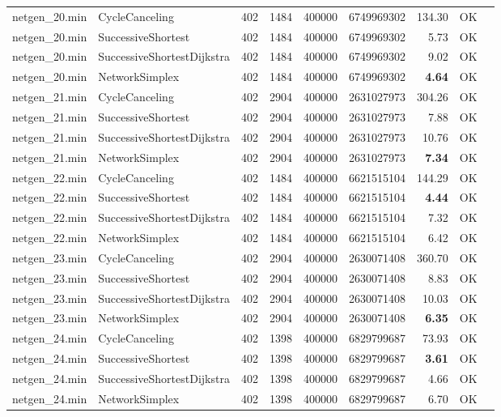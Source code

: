 \begin{longtable}{llrrrrrrl}
netgen\_20.min & CycleCanceling & 402 & 1484 & 400000 & 6749969302 & 134.30 & OK \\
netgen\_20.min & SuccessiveShortest & 402 & 1484 & 400000 & 6749969302 & 5.73 & OK \\
netgen\_20.min & SuccessiveShortestDijkstra & 402 & 1484 & 400000 & 6749969302 & 9.02 & OK \\
netgen\_20.min & NetworkSimplex & 402 & 1484 & 400000 & 6749969302 & \textbf{4.64} & OK \\
\midrule
netgen\_21.min & CycleCanceling & 402 & 2904 & 400000 & 2631027973 & 304.26 & OK \\
netgen\_21.min & SuccessiveShortest & 402 & 2904 & 400000 & 2631027973 & 7.88 & OK \\
netgen\_21.min & SuccessiveShortestDijkstra & 402 & 2904 & 400000 & 2631027973 & 10.76 & OK \\
netgen\_21.min & NetworkSimplex & 402 & 2904 & 400000 & 2631027973 & \textbf{7.34} & OK \\
\midrule
netgen\_22.min & CycleCanceling & 402 & 1484 & 400000 & 6621515104 & 144.29 & OK \\
netgen\_22.min & SuccessiveShortest & 402 & 1484 & 400000 & 6621515104 & \textbf{4.44} & OK \\
netgen\_22.min & SuccessiveShortestDijkstra & 402 & 1484 & 400000 & 6621515104 & 7.32 & OK \\
netgen\_22.min & NetworkSimplex & 402 & 1484 & 400000 & 6621515104 & 6.42 & OK \\
\midrule
netgen\_23.min & CycleCanceling & 402 & 2904 & 400000 & 2630071408 & 360.70 & OK \\
netgen\_23.min & SuccessiveShortest & 402 & 2904 & 400000 & 2630071408 & 8.83 & OK \\
netgen\_23.min & SuccessiveShortestDijkstra & 402 & 2904 & 400000 & 2630071408 & 10.03 & OK \\
netgen\_23.min & NetworkSimplex & 402 & 2904 & 400000 & 2630071408 & \textbf{6.35} & OK \\
\midrule
netgen\_24.min & CycleCanceling & 402 & 1398 & 400000 & 6829799687 & 73.93 & OK \\
netgen\_24.min & SuccessiveShortest & 402 & 1398 & 400000 & 6829799687 & \textbf{3.61} & OK \\
netgen\_24.min & SuccessiveShortestDijkstra & 402 & 1398 & 400000 & 6829799687 & 4.66 & OK \\
netgen\_24.min & NetworkSimplex & 402 & 1398 & 400000 & 6829799687 & 6.70 & OK \\

\end{longtable}
